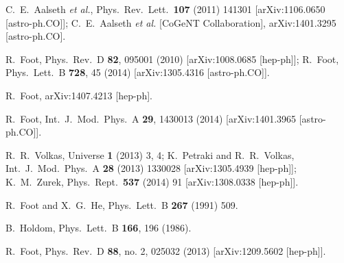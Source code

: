 \documentclass[12pt]{article}
\begin{document}
{{\begin{thebibliography}{999}
  C.~E.~Aalseth {\it et al.},
  Phys.\ Rev.\ Lett.\  {\bf 107} (2011) 141301
  [arXiv:1106.0650 [astro-ph.CO]];
  C.~E.~Aalseth {\it et al.}  [CoGeNT Collaboration],
  arXiv:1401.3295 [astro-ph.CO].
  
  R.~Foot,
  Phys.\ Rev.\ D {\bf 82}, 095001 (2010)
  [arXiv:1008.0685 [hep-ph]];
  R.~Foot,
  Phys.\ Lett.\ B {\bf 728}, 45 (2014)
  [arXiv:1305.4316 [astro-ph.CO]].
  
  R.~Foot,
  arXiv:1407.4213 [hep-ph].
  
  R.~Foot,
  Int.\ J.\ Mod.\ Phys.\ A {\bf 29}, 1430013 (2014)
  [arXiv:1401.3965 [astro-ph.CO]].

  R.~R.~Volkas,
  Universe {\bf 1} (2013) 3,  4;
  K.~Petraki and R.~R.~Volkas,
  Int.\ J.\ Mod.\ Phys.\ A {\bf 28} (2013) 1330028
  [arXiv:1305.4939 [hep-ph]];
  K.~M.~Zurek,
  Phys.\ Rept.\  {\bf 537} (2014) 91
  [arXiv:1308.0338 [hep-ph]].
  
  R.~Foot and X.~G.~He,
  Phys.\ Lett.\ B {\bf 267} (1991) 509.
  
  B.~Holdom,
  Phys.\ Lett.\ B {\bf 166}, 196 (1986).
  
  R.~Foot,
  Phys.\ Rev.\ D {\bf 88}, no. 2, 025032 (2013)
  [arXiv:1209.5602 [hep-ph]].
  

\end{thebibliography}}}
\end{document}
